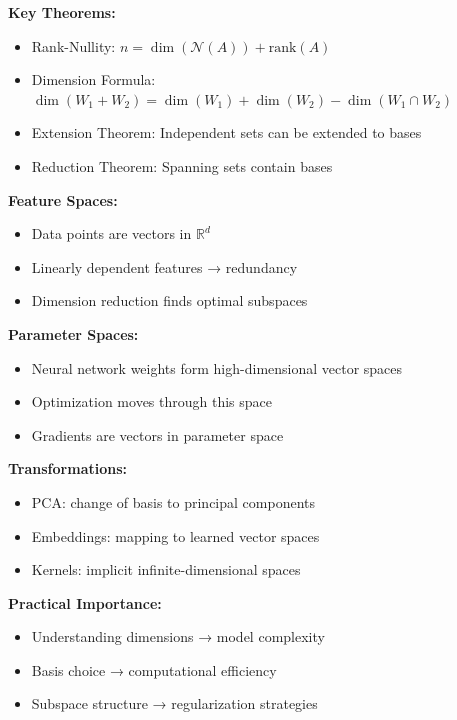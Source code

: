 \documentclass[12pt,a4paper]{article}
\theoremstyle{definition}
\begin{document}
\begin{tcolorbox}[enhanced,breakable,colback=yellow!10!white,colframe=orange!75!black,title=Essential Concepts]
\textbf{Key Theorems:}
\begin{itemize}
    \item Rank-Nullity: $n = \dim(\mathcal{N}(A)) + \text{rank}(A)$
    \item Dimension Formula: $\dim(W_1 + W_2) = \dim(W_1) + \dim(W_2) - \dim(W_1 \cap W_2)$
    \item Extension Theorem: Independent sets can be extended to bases
    \item Reduction Theorem: Spanning sets contain bases
\end{itemize}
\end{tcolorbox}

\begin{tcolorbox}[enhanced,breakable,colback=green!10!white,colframe=green!75!black,title=ML/DL Connections]
\textbf{Feature Spaces:}
\begin{itemize}
    \item Data points are vectors in $\mathbb{R}^d$
    \item Linearly dependent features → redundancy
    \item Dimension reduction finds optimal subspaces
\end{itemize}

\textbf{Parameter Spaces:}
\begin{itemize}
    \item Neural network weights form high-dimensional vector spaces
    \item Optimization moves through this space
    \item Gradients are vectors in parameter space
\end{itemize}

\textbf{Transformations:}
\begin{itemize}
    \item PCA: change of basis to principal components
    \item Embeddings: mapping to learned vector spaces
    \item Kernels: implicit infinite-dimensional spaces
\end{itemize}

\textbf{Practical Importance:}
\begin{itemize}
    \item Understanding dimensions → model complexity
    \item Basis choice → computational efficiency
    \item Subspace structure → regularization strategies
\end{itemize}
\end{tcolorbox}
\end{document}
